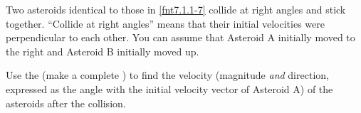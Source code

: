 \label{fnt7.2.1-7}

Two asteroids identical to those in \ref{fnt7.1.1-7} collide at right angles and stick together. ``Collide at right angles'' means that their initial velocities were perpendicular to each other. You can assume that Asteroid A initially moved to the right and Asteroid B initially moved up.

Use the \pModel{} (make a complete \pchart{}) to find the velocity (magnitude \emph{and} direction, expressed as the angle with the initial velocity vector of Asteroid A) of the asteroids after the collision.  
